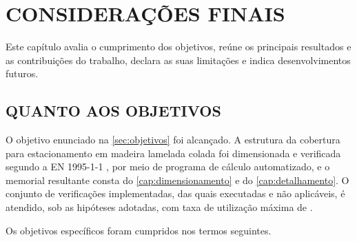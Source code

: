 
\chapter{CONSIDERAÇÕES FINAIS}\label{cap:consideracoes}

Este capítulo avalia o cumprimento dos objetivos, reúne os principais
resultados e as contribuições do trabalho, declara as suas limitações e indica
desenvolvimentos futuros.

\section{QUANTO AOS OBJETIVOS}\label{sec:quanto-objetivos}

O objetivo enunciado na \autoref{sec:objetivos} foi alcançado. A
estrutura da cobertura para estacionamento em madeira lamelada colada foi dimensionada e verificada
segundo a EN 1995-1-1 \cite{EN1995-1-1:2004}, por meio de programa de cálculo
automatizado, e o memorial resultante consta do
\autoref{cap:dimensionamento} e do \autoref{cap:detalhamento}. O conjunto de
\nVerifExt{} verificações implementadas, das quais \nVerifExecExt{} executadas e
\nVerifNAExt{} não aplicáveis, é atendido, sob as hipóteses adotadas,
com taxa de utilização máxima de \etaMaxGlobal.

Os objetivos específicos foram cumpridos nos termos seguintes.

